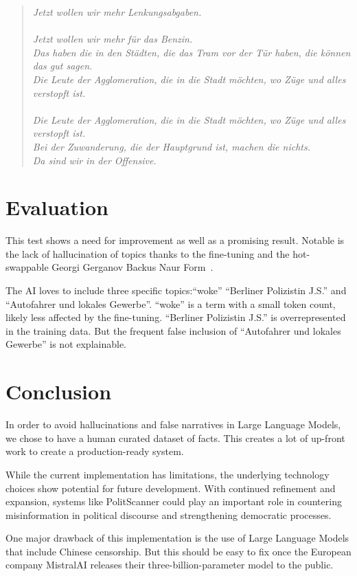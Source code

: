 \documentclass[a4paper,11pt]{report}
\newenvironment{itquote}
	{\begin{quote}\itshape}
	{\end{quote}\ignorespacesafterend}
\begin{document}
\begin{itquote}
				Jetzt wollen wir mehr Lenkungsabgaben.\\
				\\
				Jetzt wollen wir mehr für das Benzin.\\
				Das haben die in den Städten, die das Tram vor der Tür haben, die können das gut sagen.\\
				Die Leute der Agglomeration, die in die Stadt möchten, wo Züge und alles verstopft ist.\\
				\\
				Die Leute der Agglomeration, die in die Stadt möchten, wo Züge und alles verstopft ist.\\
				Bei der Zuwanderung, die der Hauptgrund ist, machen die nichts.\\
				Da sind wir in der Offensive.
			\end{itquote}

	    \section{Evaluation}\label{sec:evaluation}
			This test shows a need for improvement as well as a promising result.
			Notable is the lack of hallucination of topics thanks to the fine-tuning and the hot-swappable Georgi Gerganov Backus Naur Form~\cite{gbnf}.

			The AI loves to include three specific topics:\enquote{woke} \enquote{Berliner Polizistin J.S.} and \enquote{Autofahrer und lokales Gewerbe}.
			\enquote{woke} is a term with a small token count, likely less affected by the fine-tuning.
			\enquote{Berliner Polizistin J.S.} is overrepresented in the training data.
	        But the frequent false inclusion of \enquote{Autofahrer und lokales Gewerbe} is not explainable.

		\section{Conclusion}\label{sec:conclusion}
			In order to avoid hallucinations and false narratives in Large Language Models, we chose to have a human curated dataset of facts.
	        This creates a lot of up-front work to create a production-ready system.

		    While the current implementation has limitations, the underlying technology choices show potential for future development.
			With continued refinement and expansion, systems like PolitScanner could play an important role in countering misinformation in political discourse and strengthening democratic processes.

	        One major drawback of this implementation is the use of Large Language Models that include Chinese censorship.
	        But this should be easy to fix once the European company MistralAI releases their three-billion-parameter model to the public.
	        
	\printbibliography[heading=bibintoc]
\end{document}
